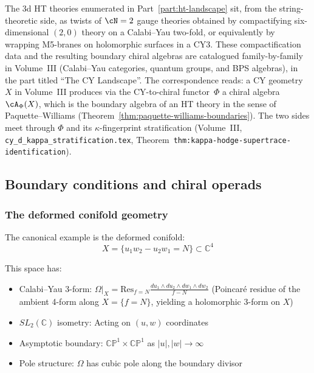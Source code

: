 \begin{remark}
\label{rem:vol-iii-cy-landscape-bridge}
The 3d HT theories enumerated in
Part~\ref{part:ht-landscape} sit, from the
string-theoretic side, as twists of $\cN=2$ gauge theories obtained
by compactifying six-dimensional $(2,0)$ theory on a Calabi--Yau
two-fold, or equivalently by wrapping M5-branes on holomorphic
surfaces in a CY3. These compactification data and the resulting
boundary chiral algebras are catalogued family-by-family in
Volume~III (Calabi--Yau categories, quantum groups, and BPS
algebras), in the part titled ``The CY Landscape''. The correspondence
reads: a CY geometry $X$ in Volume~III produces via the
CY-to-chiral functor~$\Phi$ a chiral algebra
$\cA_\Phi(X)$, which is the boundary algebra of an HT theory in
the sense of Paquette--Williams (Theorem~\ref{thm:paquette-williams-boundaries}).
The two sides meet through $\Phi$ and
its $\kappa$-fingerprint stratification
(Volume~III, \texttt{cy\_d\_kappa\_stratification.tex},
Theorem~\texttt{thm:kappa-hodge-supertrace-identification}).
\end{remark}

\subsection{Boundary conditions and chiral operads}

\subsubsection{The deformed conifold geometry}

\begin{example}
The canonical example is the deformed conifold:
\[X = \{u_1 w_2 - u_2 w_1 = N\} \subset \mathbb{C}^4\]

This space has:
\begin{itemize}
\item Calabi--Yau 3-form: $\Omega|_X = \mathrm{Res}_{f=N}\frac{du_1 \wedge du_2 \wedge dw_1
\wedge dw_2}{f - N}$ (Poincar\'e residue of the ambient 4-form along $X = \{f = N\}$, yielding a holomorphic 3-form on $X$)
\item $SL_2(\mathbb{C})$ isometry: Acting on $(u, w)$ coordinates
\item Asymptotic boundary: $\mathbb{CP}^1 \times \mathbb{CP}^1$ as $|u|, |w|
\to \infty$
\item Pole structure: $\Omega$ has cubic pole along the boundary divisor
\end{itemize}
\end{example}


